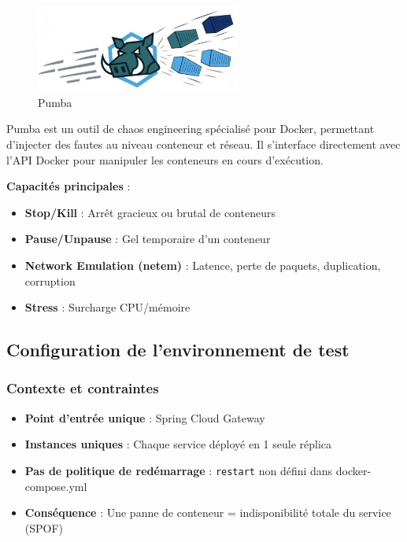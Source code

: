 \begin{figure}[H]
\centering
\includegraphics[width=0.6\textwidth]{images/Pumba.png}
\caption{Pumba}
\end{figure}

Pumba est un outil de chaos engineering spécialisé pour Docker, permettant d'injecter des fautes au niveau conteneur et réseau. Il s'interface directement avec l'API Docker pour manipuler les conteneurs en cours d'exécution.

\textbf{Capacités principales} :
\begin{itemize}
    \item \textbf{Stop/Kill} : Arrêt gracieux ou brutal de conteneurs
    \item \textbf{Pause/Unpause} : Gel temporaire d'un conteneur
    \item \textbf{Network Emulation (netem)} : Latence, perte de paquets, duplication, corruption
    \item \textbf{Stress} : Surcharge CPU/mémoire
\end{itemize}

\subsection{Configuration de l'environnement de test}

\subsubsection{Contexte et contraintes}

\begin{itemize}
    \item \textbf{Point d'entrée unique} : Spring Cloud Gateway 
    \item \textbf{Instances uniques} : Chaque service déployé en 1 seule réplica
    \item \textbf{Pas de politique de redémarrage} : \texttt{restart} non défini dans docker-compose.yml
    \item \textbf{Conséquence} : Une panne de conteneur = indisponibilité totale du service (SPOF)
\end{itemize}


